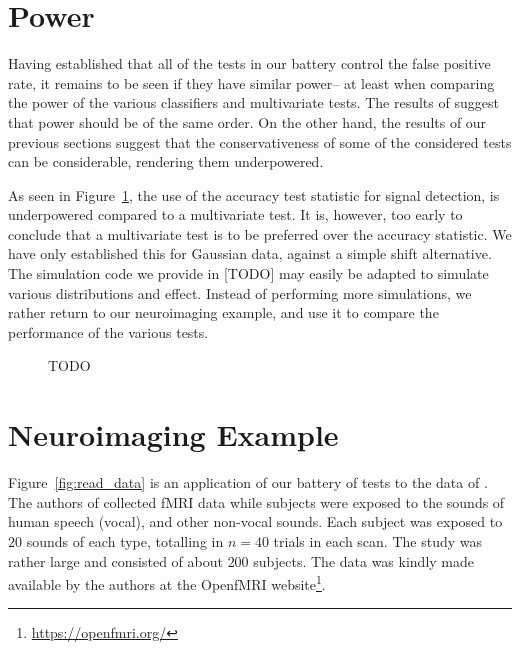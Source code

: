 \documentclass[12pt,a4paper]{article}
\begin{document}
\begin{figure}[h]
\end{figure}




\section{Power}
\label{sec:power}

Having established that all of the tests in our battery control the false positive rate, it remains to be seen if they have similar power-- at least when comparing the power of the various classifiers and multivariate tests. 
The results of \cite{ramdas_classification_2016} suggest that power should be of the same order. 
On the other hand, the results of our previous sections suggest that the conservativeness of some of the considered tests can be considerable, rendering them underpowered. 

As seen in Figure~\ref{fig:simulation_2}, the use of the accuracy test statistic for signal detection, is underpowered compared to a multivariate test. 
It is, however, too early to conclude that a multivariate test is to be preferred over the accuracy statistic. We have only established this for Gaussian data, against a simple shift alternative. 
The simulation code we provide in [TODO] may easily be adapted to simulate various distributions and effect. 
Instead of performing more simulations, we rather return to our neuroimaging example, and use it to compare the performance of the various tests. 

\begin{figure}[h]
\centering
\caption{
	\label{fig:simulation_2}
	TODO}
\end{figure}





\section{Neuroimaging Example}
\label{sec:example}

Figure~\ref{fig:read_data} is an application of our battery of tests to the data of \cite{pernet_human_2015}. 
The authors of \cite{pernet_human_2015} collected fMRI data while subjects were exposed to the sounds of human speech (vocal), and other non-vocal sounds. 
Each subject was exposed to $20$ sounds of each type, totalling in $n=40$ trials in each scan.
The study was rather large and consisted of about $200$ subjects.
The data was kindly made available by the authors at the OpenfMRI website\footnote{\url{https://openfmri.org/}}.
\end{document}
